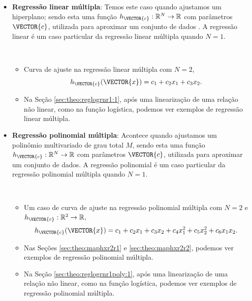 \begin{itemize}
\item \textbf{Regressão linear múltipla}:
Temos este caso quando ajustamos um hiperplano;
sendo esta uma função $h_{\VECTOR{c}}:\mathbb{R}^{N} \rightarrow \mathbb{R}$ com parâmetros $\VECTOR{c}$, 
utilizada para aproximar um conjunto de dados \cite[pp. 399, 418]{chapra2016metodos}.
A regressão linear é um caso particular da regressão linear múltipla quando $N=1$.
\begin{example}~
\begin{itemize}
\item Curva de ajuste na regressão linear múltipla com $N=2$, 
\begin{equation}
h_{\VECTOR{c}}(\VECTOR{x})=c_1+c_2 x_1+c_3 x_2.
\end{equation}
\item Na Seção \ref{sec:theo:reglogrnr1:1}, após uma linearização de uma relação não linear,
como na função logística, podemos ver exemplos de regressão linear múltipla.
\end{itemize}
\end{example}

\item \textbf{Regressão polinomial múltipla}:
Acontece quando ajustamos um polinômio multivariado de grau total $M$,
sendo esta uma função $h_{\VECTOR{c}}:\mathbb{R}^{N} \rightarrow \mathbb{R}$ com parâmetros $\VECTOR{c}$, 
utilizada para aproximar um conjunto de dados.
A regressão polinomial é um caso particular da regressão polinomial múltipla quando $N=1$.
\begin{example}~
\begin{itemize}
\item Um caso de curva de ajuste na regressão polinomial múltipla com 
$N=2$ e $h_{\VECTOR{c}}:\mathbb{R}^{2} \rightarrow \mathbb{R}$, 
\begin{equation}
h_{\VECTOR{c}}(\VECTOR{x})=c_1+c_2 x_1+c_3 x_2+c_4 x_1^2+c_5 x_2^2+c_6 x_1 x_2.
\end{equation}
\item Nas Seções \ref{sec:theo:maphxr2r1} e \ref{sec:theo:maphxr2r2},
 podemos ver exemplos de regressão polinomial múltipla.
\item Na Seção \ref{sec:theo:reglogrnr1poly:1}, após uma linearização de uma relação não linear,
como na função logística, podemos ver exemplos de regressão polinomial múltipla.
\end{itemize}
\end{example}


\end{itemize}
